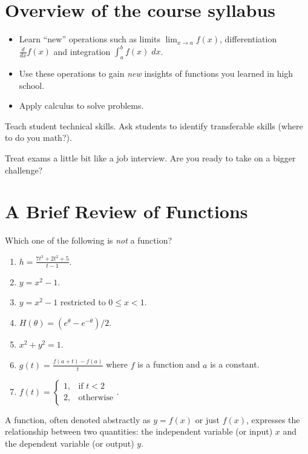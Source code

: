 \documentclass[../main.tex]{subfiles}
\begin{document}

\section{Overview of the course syllabus}


\begin{itemize}
  \item Learn ``new'' operations such as limits \(\lim_{x \to a} f(x)\), differentiation \(\frac{d}{dx} f(x)\) and integration \(\int_{a}^{b}f(x)\;dx\).
  \item Use these operations to gain \emph{new} insights of functions you learned in high school.
  \item Apply calculus to solve problems.
\end{itemize}

Teach student technical skills. Ask students to identify transferable skills (where to do you math?).

Treat exams a little bit like a job interview. Are you ready to take on a bigger challenge?

\section{A Brief Review of Functions}

\begin{example}
  Which one of the following is \emph{not} a function?
  \begin{enumerate}[label=(\alph*)]
    \item \(h = \frac{7t^{3} + 2t^{2} + 5}{t - 1}\).
    \item \(y = x^{2} - 1\).
    \item \(y = x^{2} - 1\) restricted to \(0 \le x < 1\).
    \item \(H(\theta) = (e^{\theta} - e^{-\theta})/2\).
    \item \(x^{2} + y^{2} = 1\).
    \item \(g(t) = \frac{f(a + t) - f(a)}{t}\) where \(f\) is a function and \(a\) is a constant.
    \item \(f(t) = \begin{cases} 1, &\text{if } t < 2 \\ 2, &\text{otherwise} \end{cases}\).
  \end{enumerate}
\end{example}
\vfill

A function, often denoted abstractly as \(y = f(x)\) or just \(f(x)\), expresses the relationship between two quantities: the {independent variable} (or input) \(x\) and the {dependent variable} (or output) \(y\).
\end{document}
